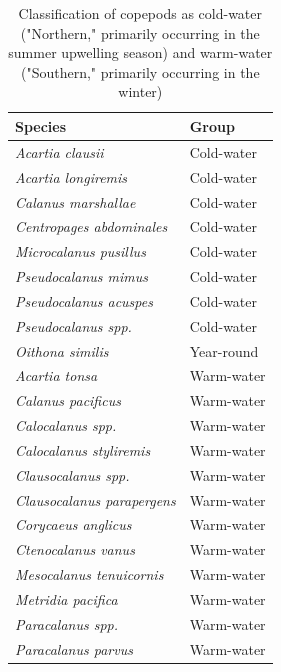 \documentclass[12pt,twoside]{reedthesis}
\begin{document}
{\begin{table}[!h]
	\caption[Seasonal classification of copepods]{Classification of copepods as cold-water ("Northern," primarily occurring in the summer upwelling season) and warm-water ("Southern," primarily occurring in the winter) \autocite{NOAAFisheries2024, Peterson2003, Peterson1977}}  %
	
	\begin{center} 
		\begin{tabular}{l l}  
			\toprule
			Species &  Group \\ 
			\midrule 
			\textit{Acartia clausii} 				& 	Cold-water 	 \\ 
			\textit{Acartia longiremis}	& Cold-water  \\
			\textit{Calanus marshallae}	& Cold-water  \\
			\textit{Centropages abdominales}	& Cold-water  \\
			\textit{Microcalanus pusillus}	& Cold-water  \\
			\textit{Pseudocalanus mimus} & Cold-water  \\
			\textit{Pseudocalanus acuspes} & Cold-water  \\
			\textit{Pseudocalanus spp.}	& Cold-water  \\
			\textit{Oithona similis}	& Year-round  \\
			\textit{Acartia tonsa}	& Warm-water  \\
			\textit{Calanus pacificus}	& Warm-water  \\
			\textit{Calocalanus spp.}	& Warm-water  \\
			\textit{Calocalanus styliremis}	& Warm-water  \\
			\textit{Clausocalanus spp.}	& Warm-water  \\
			\textit{Clausocalanus parapergens} & Warm-water  \\
			\textit{Corycaeus anglicus}	& Warm-water  \\
			\textit{Ctenocalanus vanus}	& Warm-water  \\
			\textit{Mesocalanus tenuicornis}	& Warm-water  \\
			\textit{Metridia pacifica}	& Warm-water  \\
			\textit{Paracalanus spp.}	& Warm-water  \\
			\textit{Paracalanus parvus}	& Warm-water  \\
			\bottomrule 
		\end{tabular}
		\label{CopepodGroups} %
	\end{center}
\end{table}

}
\end{document}
